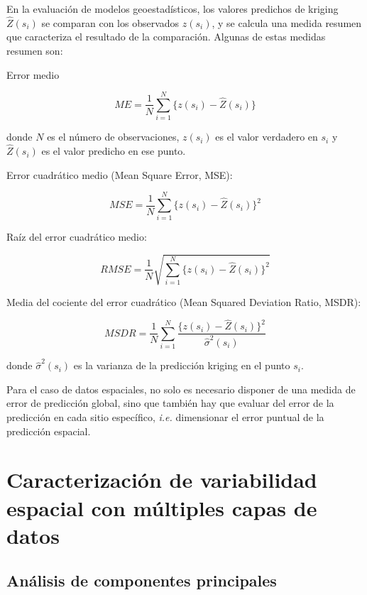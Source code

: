\documentclass[11pt,b5paper,]{krantz}
\begin{document}
En la evaluación de modelos geoestadísticos, los valores predichos de kriging \(\hat{Z}(s_i)\) se comparan con los observados \(z(s_i)\), y se calcula una medida resumen que caracteriza el resultado de la comparación. Algunas de estas medidas resumen son:

Error medio

\[ME=\frac{1}{N}\sum_{i=1}^{N}\big\{z(s_i)-\hat{Z}(s_i)\big\}\]

donde \(N\) es el número de observaciones, \(z(s_i)\) es el valor verdadero en \(s_i\) y \(\hat{Z}(s_i)\) es el valor predicho en ese punto.

Error cuadrático medio (Mean Square Error, MSE):

\[MSE=\frac{1}{N}\sum_{i=1}^{N}{\big\{z(s_i)-\hat{Z}(s_i)\big\}^2}\]

Raíz del error cuadrático medio:

\[RMSE=\frac{1}{N}\sqrt{\sum_{i=1}^{N}\big\{z(s_i)-\hat{Z}(s_i)\big\}^2}\]

Media del cociente del error cuadrático (Mean Squared Deviation Ratio, MSDR):

\[MSDR=\frac{1}{N} \sum_{i=1}^{N}\frac{ \big\{ z(s_i) - \hat{Z}(s_i) \big\}^2} {\hat{\sigma}^2(s_i)}\]

donde \(\hat{\sigma}^2(s_i)\) es la varianza de la predicción kriging en el punto \(s_i\).

Para el caso de datos espaciales, no solo es necesario disponer de una medida de error de predicción global, sino que también hay que evaluar del error de la predicción en cada sitio específico, \emph{i.e.} dimensionar el error puntual de la predicción espacial.

\hypertarget{caracterizaciuxf3n-de-variabilidad-espacial-con-muxfaltiples-capas-de-datos}{%
\chapter{Caracterización de variabilidad espacial con múltiples capas de datos}\label{caracterizaciuxf3n-de-variabilidad-espacial-con-muxfaltiples-capas-de-datos}}

\hypertarget{anuxe1lisis-de-componentes-principales}{%
\section{Análisis de componentes principales}\label{anuxe1lisis-de-componentes-principales}}
\end{document}

